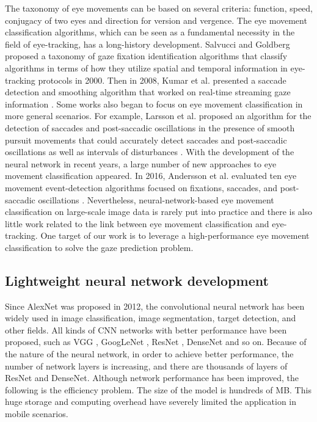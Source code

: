 \documentclass[acmlarge]{acmart}
\begin{document}
The taxonomy of eye movements can be based on several criteria: function, speed, conjugacy of two eyes and direction for version and vergence. \cite{alpern1962muscular} The eye movement classification algorithms, which can be seen as a fundamental necessity in the field of eye-tracking, has a long-history development. \cite{komogortsev2010qualitative} Salvucci and Goldberg proposed a taxonomy of gaze fixation identification algorithms that classify algorithms in terms of how they utilize spatial and temporal information in eye-tracking protocols in 2000. \cite{salvucci2000identifying} Then in 2008, Kumar et al. presented a saccade detection and smoothing algorithm that worked on real-time streaming gaze information \cite{kumar2008improving}. Some works also began to focus on eye movement classification in more general scenarios. For example, Larsson et al. proposed an algorithm for the detection of saccades and post-saccadic oscillations in the presence of smooth pursuit movements that could accurately detect saccades and post-saccadic oscillations as well as intervals of disturbances \cite{larsson2013detection}.  With the development of the neural network in recent years, a large number of new approaches to eye movement classification appeared. In 2016, Andersson et al. evaluated ten eye movement event-detection algorithms focused on fixations, saccades, and post-saccadic oscillations \cite{andersson2017one}. Nevertheless, neural-network-based eye movement classification on large-scale image data is rarely put into practice and there is also little work related to the link between eye movement classification and eye-tracking. One target of our work is to leverage a high-performance eye movement classification to solve the gaze prediction problem.

\subsection{Lightweight neural network development}

Since AlexNet \cite{krizhevsky2012imagenet} was proposed in 2012, the convolutional neural network has been widely used in image classification, image segmentation, target detection, and other fields. All kinds of CNN networks with better performance have been proposed, such as VGG \cite{simonyan2014very}, GoogLeNet \cite{szegedy2015going}, ResNet \cite{he2016deep}, DenseNet \cite{huang2017densely} and so on. Because of the nature of the neural network, in order to achieve better performance, the number of network layers is increasing, and there are thousands of layers of ResNet and DenseNet. Although network performance has been improved, the following is the efficiency problem. The size of the model is hundreds of MB. This huge storage and computing overhead have severely limited the application in mobile scenarios.
\end{document}
